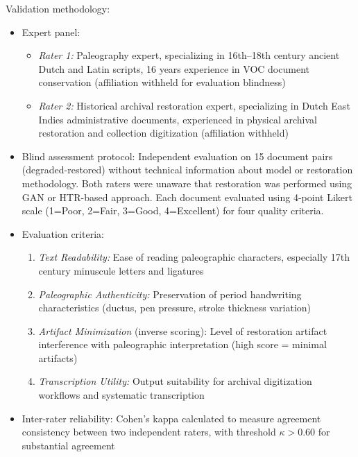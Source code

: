 \documentclass[journal]{IEEEtran}
\begin{document}
Validation methodology:
\begin{itemize}
    \item Expert panel: 
    \begin{itemize}
        \item[$-$] \textit{Rater 1:} Paleography expert, specializing in 16th--18th century ancient Dutch and Latin scripts, 16 years experience in VOC document conservation (affiliation withheld for evaluation blindness)
        \item[$-$] \textit{Rater 2:} Historical archival restoration expert, specializing in Dutch East Indies administrative documents, experienced in physical archival restoration and collection digitization (affiliation withheld)
    \end{itemize}
    \item Blind assessment protocol: Independent evaluation on 15 document pairs (degraded-restored) without technical information about model or restoration methodology. Both raters were unaware that restoration was performed using GAN or HTR-based approach. Each document evaluated using 4-point Likert scale (1=Poor, 2=Fair, 3=Good, 4=Excellent) for four quality criteria.
    \item Evaluation criteria:
    \begin{enumerate}
        \item \textit{Text Readability:} Ease of reading paleographic characters, especially 17th century minuscule letters and ligatures
        \item \textit{Paleographic Authenticity:} Preservation of period handwriting characteristics (ductus, pen pressure, stroke thickness variation)
        \item \textit{Artifact Minimization} (inverse scoring): Level of restoration artifact interference with paleographic interpretation (high score = minimal artifacts)
        \item \textit{Transcription Utility:} Output suitability for archival digitization workflows and systematic transcription
    \end{enumerate}
    \item Inter-rater reliability: Cohen's kappa calculated to measure agreement consistency between two independent raters, with threshold $\kappa > 0.60$ for substantial agreement~\cite{landis1977}
\end{itemize}
\end{document}
